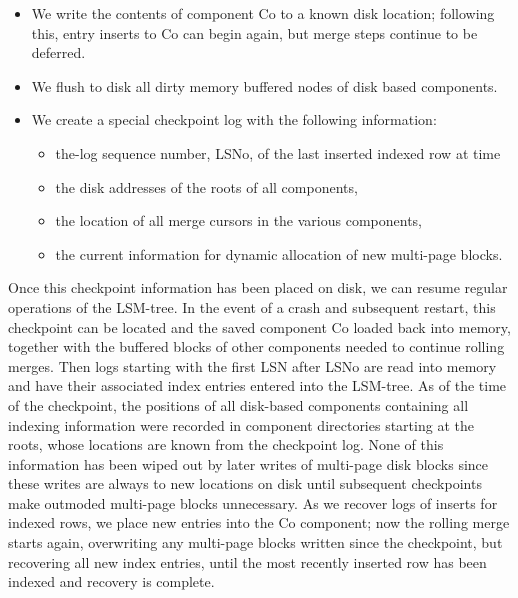 \documentclass[a4paper,11pt,notitlepage,twoside,openright]{article}
\begin{document}
\begin{itemize}
\item
  We write the contents of component Co to a known disk location;
  following this, entry inserts to Co can begin again, but merge steps
  continue to be deferred.
\item
  We flush to disk all dirty memory buffered nodes of disk based
  components.
\item
  We create a special checkpoint log with the following information:

  \begin{itemize}
  \item

    the-log sequence number, LSNo, of the last inserted indexed row at
    time

  \item

    the disk addresses of the roots of all components,

  \item

    the location of all merge cursors in the various components,

  \item

    the current information for dynamic allocation of new multi-page
    blocks.

  \end{itemize}
\end{itemize}


Once this checkpoint information has been placed on disk, we can resume
regular operations of the LSM-tree. In the event of a crash and
subsequent restart, this checkpoint can be located and the saved
component Co loaded back into memory, together with the buffered blocks
of other components needed to continue rolling merges. Then logs
starting with the first LSN after LSNo are read into memory and have
their associated index entries entered into the LSM-tree. As of the time
of the checkpoint, the positions of all disk-based components containing
all indexing information were recorded in component directories starting
at the roots, whose locations are known from the checkpoint log. None of
this information has been wiped out by later writes of multi-page disk
blocks since these writes are always to new locations on disk until
subsequent checkpoints make outmoded multi-page blocks unnecessary. As
we recover logs of inserts for indexed rows, we place new entries into
the Co component; now the rolling merge starts again, overwriting any
multi-page blocks written since the checkpoint, but recovering all new
index entries, until the most recently inserted row has been indexed and
recovery is complete.
\end{document}
